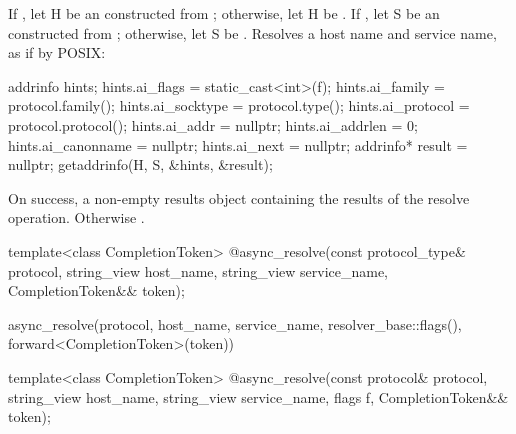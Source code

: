 \begin{itemdescr}
\pnum
\effects If , let H be an \ntbs constructed from ; otherwise, let H be . If , let S be an \ntbs constructed from ; otherwise, let S be . Resolves a host name and service name, as if by POSIX:
\begin{codeblock}
addrinfo hints;
hints.ai_flags = static_cast<int>(f);
hints.ai_family = protocol.family();
hints.ai_socktype = protocol.type();
hints.ai_protocol = protocol.protocol();
hints.ai_addr = nullptr;
hints.ai_addrlen = 0;
hints.ai_canonname = nullptr;
hints.ai_next = nullptr;
addrinfo* result = nullptr;
getaddrinfo(H, S, &hints, &result);
\end{codeblock}


\pnum
\returns On success, a non-empty results object containing the results of the resolve operation. Otherwise .
\end{itemdescr}

\begin{itemdecl}
template<class CompletionToken>
  @\DEDUCED@ async_resolve(const protocol_type& protocol,
                        string_view host_name, string_view service_name,
                        CompletionToken&& token);
\end{itemdecl}

\begin{itemdescr}
\pnum
\returns
\begin{codeblock}
async_resolve(protocol, host_name, service_name, resolver_base::flags(),
              forward<CompletionToken>(token))
\end{codeblock}
\end{itemdescr}

\begin{itemdecl}
template<class CompletionToken>
  @\DEDUCED@ async_resolve(const protocol& protocol,
                        string_view host_name, string_view service_name,
                        flags f, CompletionToken&& token);
\end{itemdecl}

